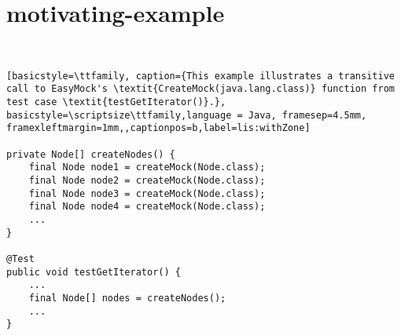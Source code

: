 \section{motivating-example}

‎

\begin{lstlisting}[basicstyle=\ttfamily, caption={This example illustrates a transitive call to EasyMock's \textit{CreateMock(java.lang.class)} function from test case \textit{testGetIterator()}.},
basicstyle=\scriptsize\ttfamily,language = Java, framesep=4.5mm,
framexleftmargin=1mm,,captionpos=b,label=lis:withZone]

private Node[] createNodes() {
	final Node node1 = createMock(Node.class);
	final Node node2 = createMock(Node.class);
	final Node node3 = createMock(Node.class);
	final Node node4 = createMock(Node.class);
	...
}

@Test
public void testGetIterator() {
	...
	final Node[] nodes = createNodes();
	...
}



\end{lstlisting}